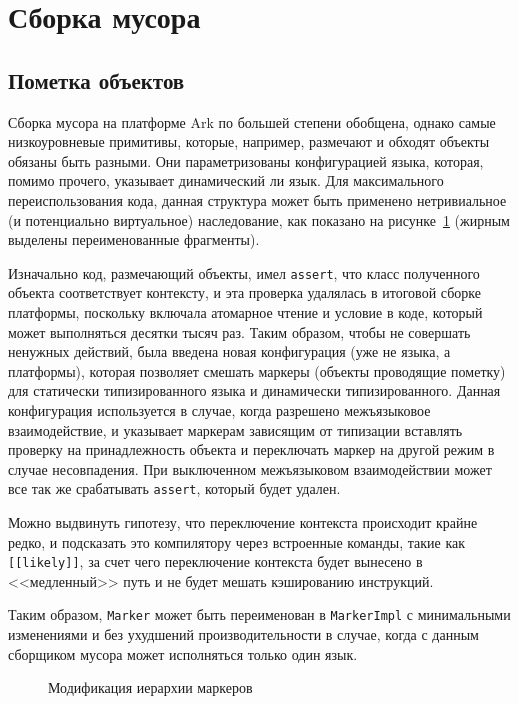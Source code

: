 \documentclass[times
,titlepage
]{itmo-student-thesis}
\begin{document}
\section{Сборка мусора}
\subsection{Пометка объектов}
Сборка мусора на платформе Ark по большей степени обобщена, однако самые низкоуровневые примитивы, которые, например, размечают и обходят объекты обязаны быть разными. Они параметризованы конфигурацией языка, которая, помимо прочего, указывает динамический ли язык. Для максимального переиспользования кода, данная структура может быть применено нетривиальное (и потенциально виртуальное) наследование, как показано на рисунке~\ref{fig:gc-markers} (жирным выделены переименованные фрагменты).

Изначально код, размечающий объекты, имел \texttt{assert}, что класс полученного объекта соответствует контексту, и эта проверка удалялась в итоговой сборке платформы, поскольку включала атомарное чтение и условие в коде, который может выполняться десятки тысяч раз. Таким образом, чтобы не совершать ненужных действий, была введена новая конфигурация (уже не языка, а платформы), которая позволяет смешать маркеры (объекты проводящие пометку) для статически типизированного языка и динамически типизированного. Данная конфигурация используется в случае, когда разрешено межъязыковое взаимодействие, и указывает маркерам зависящим от типизации вставлять проверку на принадлежность объекта и переключать маркер на другой режим в случае несовпадения. При выключенном межъязыковом взаимодействии может все так же срабатывать \texttt{assert}, который будет удален.

Можно выдвинуть гипотезу, что переключение контекста происходит крайне редко, и подсказать это компилятору через встроенные команды, такие как \texttt{[[likely]]}, за счет чего переключение контекста будет вынесено в <<медленный>> путь и не будет мешать кэшированию инструкций.

Таким образом, \texttt{Marker} может быть переименован в \texttt{MarkerImpl} с минимальными изменениями и без ухудшений производительности в случае, когда с данным сборщиком мусора может исполняться только один язык.
\begin{figure}[!h]
\caption{Модификация иерархии маркеров}\label{fig:gc-markers}
\centering
\end{figure}
\end{document}
